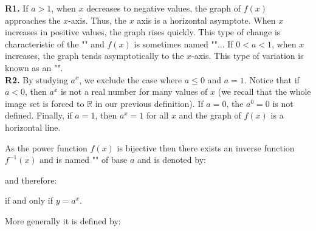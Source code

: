 	\begin{tcolorbox}[title=Remarks,arc=10pt,breakable,drop lifted shadow,
  skin=enhanced,
  skin first is subskin of={enhancedfirst}{arc=10pt,no shadow},
  skin middle is subskin of={enhancedmiddle}{arc=10pt,no shadow},
  skin last is subskin of={enhancedlast}{drop lifted shadow}]
	\textbf{R1.} If $a>1$, when $x$ decreases to negative values, the graph of $f (x)$ approaches the $x$-axis. Thus, the $x$ axis is a horizontal asymptote. When $x$ increases in positive values, the graph rises quickly. This type of change is characteristic of the "" and $f(x)$ is sometimes named ""... If $0<a<1$, when $x$ increases, the graph tends asymptotically to the $x$-axis. This type of variation is known as an "".\\
	
	\textbf{R2.} By studying $a^x$, we exclude the case where $a\leq 0$ and $a=1$. Notice that if $a<0$, then $a^x$ is not a real number for many values of $x$ (we recall that the whole image set is forced to $\mathbb{R}$ in our previous definition). If $a=0$, the $a^0=0$ is not defined. Finally, if $a=1$, then $a^x=1$ for all $x$ and the graph of $f(x)$ is a horizontal line.
	\end{tcolorbox}
	As the power function $f (x)$ is bijective then there exists an inverse function $f^{-1}(x)$ and is named "" of base $a$ and is denoted by:
	
	and therefore:
	
	if and only if $y=a^x$.
	
	More generally it is defined by:
	
